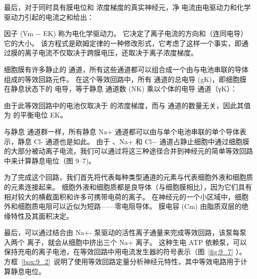 最后，对于同时具有膜电位和  浓度梯度的真实神经元，净  电流由电驱动力和化学驱动力引起的电流之和给出：


因子 (Vm − EK) 称为电化学驱动力。
它决定了离子电流的方向和（连同电导）它的大小。
该方程式是欧姆定律的一种修改形式，它考虑了这样一个事实，即通过膜的离子电流不仅取决于跨膜电压，还取决于离子浓度梯度。


细胞膜有许多静止的  通道，所有这些通道都可以组合成一个由与电池串联的导体组成的等效回路元件。
在这个等效回路中，所有  通道的总电导 (gK)，即细胞膜在静息状态下的  电导，等于静息  通道数 (NK) 乘以个体的电导 通道（γK）：


由于此等效回路中的电池仅取决于  的浓度梯度，而与  通道的数量无关，因此其值为  的平衡电位 EK。


与静息  通道群一样，所有静息 Na+ 通道都可以由与单个电池串联的单个导体表示，静息 Cl- 通道也是如此。
由于 、Na+ 和 Cl− 通道占静止细胞中通过细胞膜的大部分被动离子电流，我们可以通过将这三种途径合并到神经元的简单等效回路中来计算静息电位（图 9–7)。


为了完成这个回路，我们首先将代表每种类型通道的元素与代表细胞外液和细胞质的元素连接起来。
细胞外液和细胞质都是良导体（与细胞膜相比），因为它们具有相对较大的横截面积和许多可携带电荷的离子。
在神经元的一个小区域中，细胞外和细胞质电阻可以近似为短路——零电阻导体。
膜电容 (Cm) 由脂质双层的绝缘特性及其面积决定。


最后，可以通过结合由 Na+- 泵驱动的活性离子通量来完成等效回路，该泵每泵入两个  离子，就会从细胞中挤出三个 Na+ 离子。
这种生电 ATP 依赖泵，可以保持充电的离子电池，在等效回路中用电流发生器的符号表示（图~\ref{fig:9_7} ）。
方框~\ref{box:9_2}~说明了使用等效回路定量分析神经元特性，其中等效电路用于计算静息电位。


